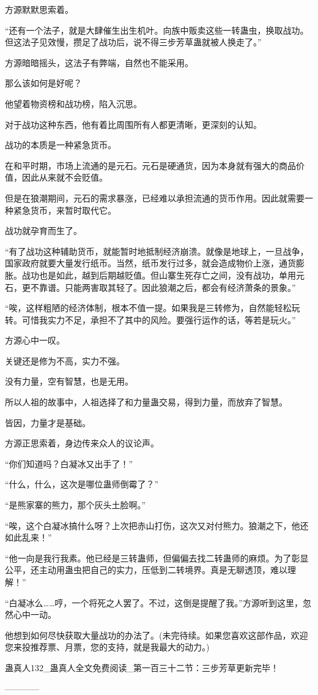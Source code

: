 \begin{this_body}
方源默默思索着。

“还有一个法子，就是大肆催生出生机叶。向族中贩卖这些一转蛊虫，换取战功。但这法子见效慢，攒足了战功后，说不得三步芳草蛊就被人换走了。”

方源暗暗摇头，这法子有弊端，自然也不能采用。

那么该如何是好呢？

他望着物资榜和战功榜，陷入沉思。

对于战功这种东西，他有着比周围所有人都更清晰，更深刻的认知。

战功的本质是一种紧急货币。

在和平时期，市场上流通的是元石。元石是硬通货，因为本身就有强大的商品价值，因此从来就不会贬值。

但是在狼潮期间，元石的需求暴涨，已经难以承担流通的货币作用。因此就需要一种紧急货币，来暂时取代它。

战功就孕育而生了。

“有了战功这种辅助货币，就能暂时地抵制经济崩溃。就像是地球上，一旦战争，国家政府就要大量发行纸币。当然，纸币发行过多，就会造成物价上涨，通货膨胀。战功也是如此，越到后期越贬值。但山寨生死存亡之间，没有战功，单用元石，更不靠谱。只能两害取其轻了。因此狼潮之后，都会有经济萧条的景象。”

“唉，这样粗陋的经济体制，根本不值一提。如果我是三转修为，自然能轻松玩转。可惜我实力不足，承担不了其中的风险。要强行运作的话，等若是玩火。”

方源心中一叹。

关键还是修为不高，实力不强。

没有力量，空有智慧，也是无用。

所以人祖的故事中，人祖选择了和力量蛊交易，得到力量，而放弃了智慧。

皆因，力量才是基础。

方源正思索着，身边传来众人的议论声。

“你们知道吗？白凝冰又出手了！”

“什么，什么，这次是哪位蛊师倒霉了？”

“是熊家寨的熊力，那个灰头土脸啊。”

“唉，这个白凝冰搞什么呀？上次把赤山打伤，这次又对付熊力。狼潮之下，他还如此乱来！”

“他一向是我行我素。他已经是三转蛊师，但偏偏去找二转蛊师的麻烦。为了彰显公平，还主动用蛊虫把自己的实力，压低到二转境界。真是无聊透顶，难以理解！”

“白凝冰么……哼，一个将死之人罢了。不过，这倒是提醒了我。”方源听到这里，忽然心中一动。

他想到如何尽快获取大量战功的办法了。(未完待续。如果您喜欢这部作品，欢迎您来投推荐票、月票，您的支持，就是我最大的动力。)

蛊真人132\_蛊真人全文免费阅读\_第一百三十二节：三步芳草更新完毕！

------------

\end{this_body}

